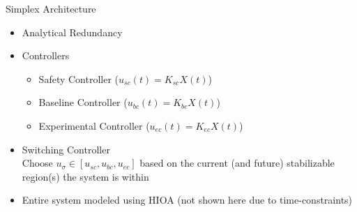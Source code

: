 \documentclass{beamer}
\begin{document}
\begin{frame}{Simplex Architecture}
\begin{itemize}
\pause \item Analytical Redundancy
\pause \item Controllers
\begin{itemize}
\pause \item Safety Controller ($u_{sc}\left(t\right)=K_{sc}X\left(t\right)$)
\pause \item Baseline Controller ($u_{bc}\left(t\right)=K_{bc}X\left(t\right)$)
\pause \item Experimental Controller ($u_{ec}\left(t\right)=K_{ec}X\left(t\right)$)
\end{itemize}
\pause \item Switching Controller\\Choose $u_{\sigma}\in\left[u_{sc}, u_{bc}, u_{ec}\right]$ based on the current (and future) stabilizable region(s) the system is within
\pause \item Entire system modeled using HIOA (not shown here due to time-constraints)
\end{itemize}

\end{frame}
\end{document}
